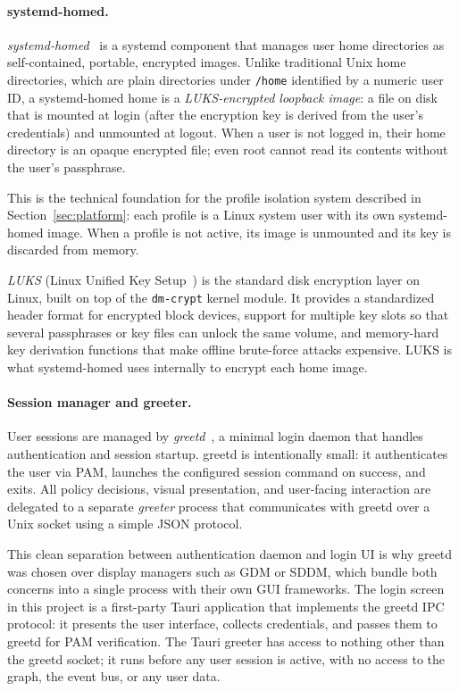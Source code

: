\paragraph{systemd-homed.}
\emph{systemd-homed}~\cite{archwiki:homed} is a systemd component
that manages user home directories as self-contained, portable, encrypted
images. Unlike traditional Unix home directories, which are plain directories
under \texttt{/home} identified by a numeric user ID, a systemd-homed home is a
\emph{LUKS-encrypted loopback image}: a file on disk that is mounted at login
(after the encryption key is derived from the user's credentials) and unmounted
at logout. When a user is not logged in, their home directory is an opaque
encrypted file; even root cannot read its contents without the user's passphrase.

This is the technical foundation for the profile isolation system described in
Section~\ref{sec:platform}: each profile is a Linux system user with its own
systemd-homed image. When a profile is not active, its image is unmounted and
its key is discarded from memory.

\emph{LUKS} (Linux Unified Key
Setup~\cite{archwiki:luks}) is
the standard disk encryption layer on Linux, built on top of the
\texttt{dm-crypt} kernel module. It provides a standardized header format for
encrypted block devices, support for multiple key slots so that several
passphrases or key files can unlock the same volume, and memory-hard key
derivation functions that make offline brute-force attacks expensive. LUKS is
what systemd-homed uses internally to encrypt each home image.

\paragraph{Session manager and greeter.}
User sessions are managed by \emph{greetd}~\cite{greetd}, a minimal login
daemon that handles authentication and session startup. greetd is
intentionally small: it authenticates the user via PAM, launches the
configured session command on success, and exits. All policy decisions, visual
presentation, and user-facing interaction are delegated to a separate
\emph{greeter} process that communicates with greetd over a Unix socket using a
simple JSON protocol.

This clean separation between authentication daemon and login UI is why greetd
was chosen over display managers such as GDM or SDDM, which bundle both
concerns into a single process with their own GUI frameworks. The login screen
in this project is a first-party Tauri application that implements the greetd
IPC protocol: it presents the user interface, collects credentials, and passes
them to greetd for PAM verification. The Tauri greeter has access to nothing
other than the greetd socket; it runs before any user session is active, with
no access to the graph, the event bus, or any user data.

